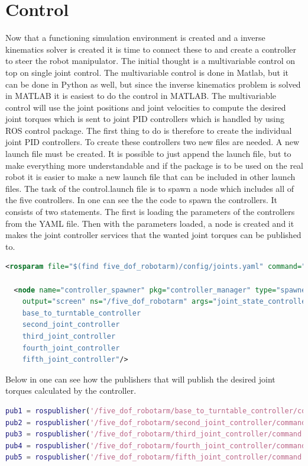 \chapter{Control}

Now that a functioning simulation environment is created and a inverse kinematics solver is created it is time to connect these to and create a controller to steer the robot manipulator. The initial thought is a multivariable control on top on single joint control. The multivariable control is done in Matlab, but it can be done in Python as well, but since the inverse kinematics problem is solved in MATLAB it is easiest to do the control in MATLAB. The multivariable control will use the joint positions and joint velocities to compute the desired joint torques which is sent to joint PID controllers which is handled by using ROS control package. The first thing to do is therefore to create the individual joint PID controllers. 
To create these controllers two new files are needed. A new launch file must be created. It is possible to just append the launch file, but to make everything more understandable and if the package is to be used on the real robot it is easier to make a new launch file that can be included in other launch files. The task of the control.launch file is to spawn a node which includes all of the five controllers. In  one can see the the code to spawn the controllers. It consists of two statements. The first is loading the parameters of the controllers from the YAML file. Then with the parameters loaded, a node is created and it makes the joint controller services that the wanted joint torques can be published to. 
\begin{lstlisting}[language=xml,caption={Spawns the controller node},label={lst:launchControl}]
<rosparam file="$(find five_dof_robotarm)/config/joints.yaml" command="load"/>

  <node name="controller_spawner" pkg="controller_manager" type="spawner" respawn="false"
	output="screen" ns="/five_dof_robotarm" args="joint_state_controller
    base_to_turntable_controller
    second_joint_controller
    third_joint_controller
    fourth_joint_controller
    fifth_joint_controller"/>
\end{lstlisting}
Below in  one can see how the publishers that will publish the desired joint torques calculated by the controller. 
\begin{lstlisting}[language=Matlab,caption={MATLAB code for creating the publishers.},label={lst:matlabPubl}]
pub1 = rospublisher('/five_dof_robotarm/base_to_turntable_controller/command','std_msgs/Float64');
pub2 = rospublisher('/five_dof_robotarm/second_joint_controller/command','std_msgs/Float64');
pub3 = rospublisher('/five_dof_robotarm/third_joint_controller/command','std_msgs/Float64');
pub4 = rospublisher('/five_dof_robotarm/fourth_joint_controller/command','std_msgs/Float64');
pub5 = rospublisher('/five_dof_robotarm/fifth_joint_controller/command','std_msgs/Float64');
\end{lstlisting}
